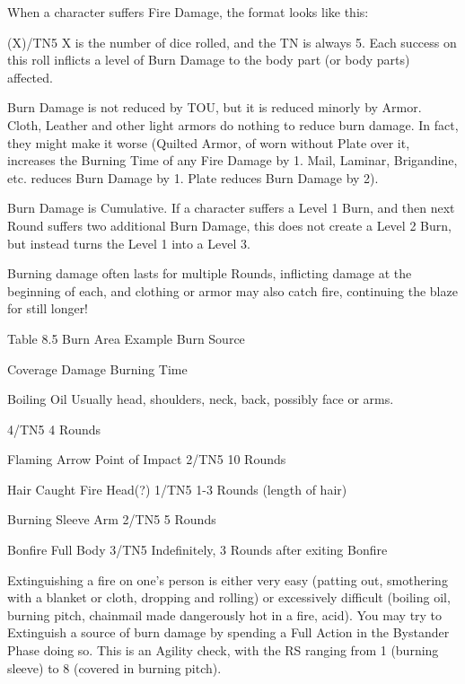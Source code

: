 \documentclass[oneside,11pt,english]{book}
\begin{document}
 

When a character suffers Fire Damage, the format looks like this: 


(X)/TN5 
X is the number of dice rolled, and the TN is always 5. Each success on this roll inflicts a level of Burn 
Damage to the body part (or body parts) affected. 

 

Burn Damage is not reduced by TOU, but it is reduced minorly by Armor. Cloth, Leather and other light 
armors do nothing to reduce burn damage. In fact, they might make it worse (Quilted Armor, of worn 
without Plate over it, increases the Burning Time of any Fire Damage by 1. Mail, Laminar, Brigandine, 
etc. reduces Burn Damage by 1. Plate reduces Burn Damage by 2). 

 

Burn Damage is Cumulative. If a character suffers a Level 1 Burn, and then next Round suffers two 
additional Burn Damage, this does not create a Level 2 Burn, but instead turns the Level 1 into a Level 3. 

 

Burning damage often lasts for multiple Rounds, inflicting damage at the beginning of each, and clothing 
or armor may also catch fire, continuing the blaze for still longer! 

 

Table 8.5 Burn Area 
Example Burn 
Source 

Coverage Damage Burning Time 

Boiling Oil Usually head, shoulders, neck, back, 
possibly face or arms. 

4/TN5 4 Rounds 

Flaming Arrow Point of Impact 2/TN5 10 Rounds 

Hair Caught Fire Head(?) 1/TN5 1-3 Rounds (length of hair) 

Burning Sleeve Arm 2/TN5 5 Rounds 

Bonfire Full Body 3/TN5 Indefinitely, 3 Rounds after 
exiting Bonfire 

 

Extinguishing a fire on one’s person is either very easy (patting out, smothering with a blanket or cloth, 
dropping and rolling) or excessively difficult (boiling oil, burning pitch, chainmail made dangerously hot 
in a fire, acid). You may try to Extinguish a source of burn damage by spending a Full Action in the 
Bystander Phase doing so. This is an Agility check, with the RS ranging from 1 (burning sleeve) to 8 
(covered in burning pitch). 
\end{document}
